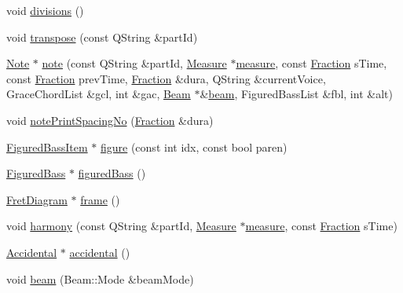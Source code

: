 \begin{DoxyCompactItemize}
\item 
void \hyperlink{class_ms_1_1_music_x_m_l_parser_pass2_a78630279e14460f929c5c31ed2567fab}{divisions} ()
\item 
void \hyperlink{class_ms_1_1_music_x_m_l_parser_pass2_a35d97342df1129c8a873332f2126fe23}{transpose} (const Q\+String \&part\+Id)
\item 
\hyperlink{class_ms_1_1_note}{Note} $\ast$ \hyperlink{class_ms_1_1_music_x_m_l_parser_pass2_acc37a226f30b5759c9ce8306b780b2fc}{note} (const Q\+String \&part\+Id, \hyperlink{class_ms_1_1_measure}{Measure} $\ast$\hyperlink{class_ms_1_1_music_x_m_l_parser_pass2_a0a37fd1f0a5c962fed1c843c00de07aa}{measure}, const \hyperlink{class_ms_1_1_fraction}{Fraction} s\+Time, const \hyperlink{class_ms_1_1_fraction}{Fraction} prev\+Time, \hyperlink{class_ms_1_1_fraction}{Fraction} \&dura, Q\+String \&current\+Voice, Grace\+Chord\+List \&gcl, int \&gac, \hyperlink{class_ms_1_1_beam}{Beam} $\ast$\&\hyperlink{class_ms_1_1_music_x_m_l_parser_pass2_a6d5d7103dc2875d9f749f22491452f63}{beam}, Figured\+Bass\+List \&fbl, int \&alt)
\item 
void \hyperlink{class_ms_1_1_music_x_m_l_parser_pass2_a6aca58f758354d164ddcffbf7ad64fdd}{note\+Print\+Spacing\+No} (\hyperlink{class_ms_1_1_fraction}{Fraction} \&dura)
\item 
\hyperlink{class_ms_1_1_figured_bass_item}{Figured\+Bass\+Item} $\ast$ \hyperlink{class_ms_1_1_music_x_m_l_parser_pass2_a7287a04f8379ee29be57827a5dd2ebe2}{figure} (const int idx, const bool paren)
\item 
\hyperlink{class_ms_1_1_figured_bass}{Figured\+Bass} $\ast$ \hyperlink{class_ms_1_1_music_x_m_l_parser_pass2_a6536c16b7e3cc48c77df3500969b0de6}{figured\+Bass} ()
\item 
\hyperlink{class_ms_1_1_fret_diagram}{Fret\+Diagram} $\ast$ \hyperlink{class_ms_1_1_music_x_m_l_parser_pass2_aad404cfd8fe13a81544bd1e8da795468}{frame} ()
\item 
void \hyperlink{class_ms_1_1_music_x_m_l_parser_pass2_aa6a09ee401d5ac7e335649f3c3266e42}{harmony} (const Q\+String \&part\+Id, \hyperlink{class_ms_1_1_measure}{Measure} $\ast$\hyperlink{class_ms_1_1_music_x_m_l_parser_pass2_a0a37fd1f0a5c962fed1c843c00de07aa}{measure}, const \hyperlink{class_ms_1_1_fraction}{Fraction} s\+Time)
\item 
\hyperlink{class_ms_1_1_accidental}{Accidental} $\ast$ \hyperlink{class_ms_1_1_music_x_m_l_parser_pass2_a6cecdfbcb5105fedfbe981ea022df7a8}{accidental} ()
\item 
void \hyperlink{class_ms_1_1_music_x_m_l_parser_pass2_a6d5d7103dc2875d9f749f22491452f63}{beam} (Beam\+::\+Mode \&beam\+Mode)

\end{DoxyCompactItemize}
